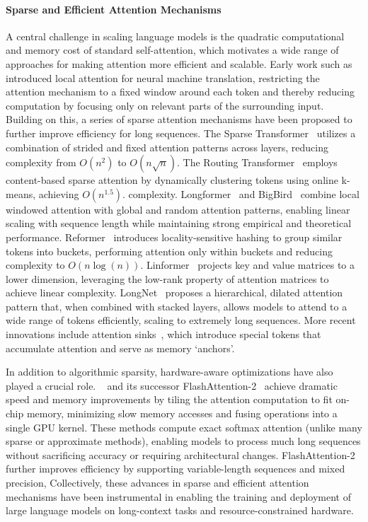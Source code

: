 \paragraph{Sparse and Efficient Attention Mechanisms}
A central challenge in scaling language models is the quadratic computational and memory cost of standard self-attention, which motivates a wide range of approaches for making attention more efficient and scalable. Early work such as \citet{luong2015effective} introduced local attention for neural machine translation, restricting the attention mechanism to a fixed window around each token and thereby reducing computation by focusing only on relevant parts of the surrounding input. Building on this, a series of sparse attention mechanisms have been proposed to further improve efficiency for long sequences. The Sparse Transformer~\citep{child2019generating} utilizes a combination of strided and fixed attention patterns across layers, reducing complexity from $O(n^2)$ to $O(n\sqrt{n})$. The Routing Transformer~\citep{roy2020efficient} employs content-based sparse attention by dynamically clustering tokens using online k-means, achieving $O(n^{1.5})$. complexity. Longformer~\citep{beltagy2020longformer} and BigBird~\citep{zaheer2020big} combine local windowed attention with global and random attention patterns, enabling linear scaling with sequence length while maintaining strong empirical and theoretical performance. Reformer~\citep{kitaev2020reformer} introduces locality-sensitive hashing to group similar tokens into buckets, performing attention only within buckets and reducing complexity to $O(n\log(n))$. Linformer~\citep{wang2020linformer} projects key and value matrices to a lower dimension, leveraging the low-rank property of attention matrices to achieve linear complexity. LongNet~\citep{ding2023longnet} proposes a hierarchical, dilated attention pattern that, when combined with stacked layers, allows models to attend to a wide range of tokens efficiently, scaling to extremely long sequences. More recent innovations include attention sinks~\citep{xiao2023attentionsink}, which introduce special tokens that accumulate attention and serve as memory `anchors'. 

In addition to algorithmic sparsity, hardware-aware optimizations have also played a crucial role. ~\citep{dao2022flashattention} and its successor FlashAttention-2~\citep{dao2023flashattention2} achieve dramatic speed and memory improvements by tiling the attention computation to fit on-chip memory, minimizing slow memory accesses and fusing operations into a single GPU kernel. These methods compute exact softmax attention (unlike many sparse or approximate methods), enabling models to process much long sequences without sacrificing accuracy or requiring architectural changes. FlashAttention-2 further improves efficiency by supporting variable-length sequences and mixed precision,  Collectively, these advances in sparse and efficient attention mechanisms have been instrumental in enabling the training and deployment of large language models on long-context tasks and resource-constrained hardware.

